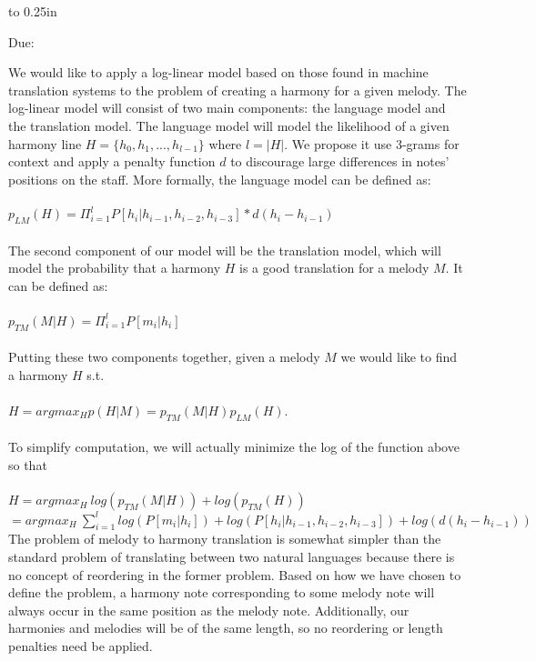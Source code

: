 \documentclass[letterpaper,12pt]{article}
\newcommand{\htitle}
{
    \vbox to 0.25in{}
    \noindent\parbox{\textwidth}
    {
        \student\hfill \assigndate\newline
        \coursename\hfill 
        Due: \duedate \vspace*{-.5ex}\newline
        \mbox{}\hrulefill\mbox{}
    }
    \vspace{8pt}
    \begin{center}{\Large\bf{\settitle}}\end{center}
}
\newcommand{\handout}
{
    \thispagestyle{empty}
    \markboth{}{}
    \pagestyle{plain}
    \htitle
}
\begin{document}
\handout
\setlength{\parindent}{0pt}

We would like to apply a log-linear model based on those found in machine translation systems to the problem of creating a harmony for a given melody. The log-linear model will consist of two main components: the language model and the translation model. The language model will model the likelihood of a  given harmony line $H = \{h_{0}, h_{1}, ... , h_{l - 1}\}$ where $l = |H|$. We propose it use 3-grams for context and apply a penalty function $d$ to discourage large differences in notes' positions on the staff. More formally, the language model can be defined as:\\
\\
$p_{LM}(H) = \Pi_{i = 1}^{l} P[h_{i} | h_{i - 1}, h_{i - 2}, h_{i - 3}]*d(h_{i} - h_{i - 1})$\\
\\
The second component of our model will be the translation model, which will model the probability that a harmony $H$ is a good translation for a melody $M$. It can be defined as:\\
\\
$p_{TM}(M | H) = \Pi_{i = 1}^{l} P[m_{i} | h_{i}]$\\
\\
Putting these two components together, given a melody $M$ we would like to find a harmony $H$ s.t.\\
\\
$H = argmax_{H}p(H | M) = p_{TM}(M | H)p_{LM}(H)$.\\
\\
To simplify computation, we will actually minimize the log of the function above so that\\
\\
$H = argmax_{H}\ log(p_{TM}(M | H)) + log(p_{TM}(H))$\\
$= argmax_{H}\ \sum_{i = 1}^{l} log(P[m_{i} | h_{i}]) + log(P[h_{i} | h_{i - 1}, h_{i - 2}, h_{i - 3}]) + log(d(h_{i} - h_{i - 1}))$
\\
The problem of melody to harmony translation is somewhat simpler than the standard problem of translating between two natural languages because there is no concept of reordering in the former problem. Based on how we have chosen to define the problem, a harmony note corresponding to some melody note will always occur in the same position as the melody note. Additionally, our harmonies and melodies will be of the same length, so no reordering or length penalties need be applied.

\vfill
\end{document}
